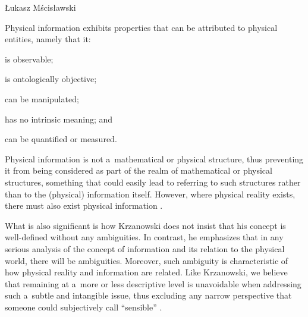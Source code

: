 \begin{artengenv}{Łukasz Mścisławski}
\begin{mscislaw}
\item  Physical information exhibits properties that can be attributed to physical entities, namely that it:
\begin{mscislaw}
\item is observable;
\item is ontologically objective;
\item can be manipulated;
\item has no intrinsic meaning; and
\item can be quantified or measured.
\end{mscislaw}
\item  Physical information is not a~mathematical or physical structure, thus preventing it from being considered as part of the realm of mathematical or physical structures, something that could easily lead to referring to such structures rather than to the (physical) information itself. However, where physical reality exists, there must also exist physical information
\parencite[cf.][pp.3–4]{krzanowski_what_2020}.%
\end{mscislaw}

What is also significant is how Krzanowski does not insist that his concept is well-defined without any ambiguities. In contrast, he emphasizes that in any serious analysis of the concept of information and its relation to the physical world, there will be ambiguities. Moreover, such ambiguity is characteristic of how physical reality and information are related. Like Krzanowski, we believe that remaining at a~more or less descriptive level is unavoidable when addressing such a~subtle and intangible issue, thus excluding any narrow perspective that someone could subjectively call ``sensible''
\parencite[cf.][p.6]{krzanowski_what_2020}.%



\end{artengenv}
